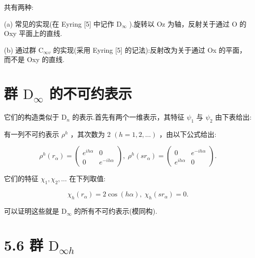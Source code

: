 \documentclass[10pt]{article}
\begin{document}
共有两种:

(a) 常见的实现(在 Eyring [5] 中记作 \({\mathrm{D}}_{\infty }\) ).旋转以 Oz 为轴，反射关于通过 O 的 Oxy 平面上的直线.

(b) 通过群 \({\mathrm{C}}_{\infty v}\) 的实现(采用 Eyring [5] 的记法):反射改为关于通过 Ox 的平面，而不是 Oxy 的直线.

\section*{群 \({\mathrm{D}}_{\infty }\) 的不可约表示}

它们的构造类似于 \({\mathrm{D}}_{n}\) 的表示.首先有两个一维表示，其特征 \({\psi }_{1}\) 与 \({\psi }_{2}\) 由下表给出:

\begin{center}
\end{center}

有一列不可约表示 \({\rho }^{h}\) ，其次数为 2 \(\left( {h = 1,2,\ldots }\right)\) ，由以下公式给出:

\[
{\rho }^{h}\left( {r}_{\alpha }\right)  = \left( \begin{matrix} {e}^{ih\alpha } & 0 \\  0 & {e}^{-{ih\alpha }} \end{matrix}\right) ,\;{\rho }^{h}\left( {s{r}_{\alpha }}\right)  = \left( \begin{matrix} 0 & {e}^{-{ih\alpha }} \\  {e}^{ih\alpha } & 0 \end{matrix}\right) .
\]

它们的特征 \({\chi }_{1},{\chi }_{2},\ldots\) 在下列取值:

\[
{\chi }_{h}\left( {r}_{\alpha }\right)  = 2\cos \left( {h\alpha }\right) ,\;{\chi }_{h}\left( {s{r}_{\alpha }}\right)  = 0.
\]

可以证明这些就是 \({\mathrm{D}}_{\infty }\) 的所有不可约表示(模同构).

\section*{5.6 群 \({\mathrm{D}}_{\infty h}\)}
\end{document}
